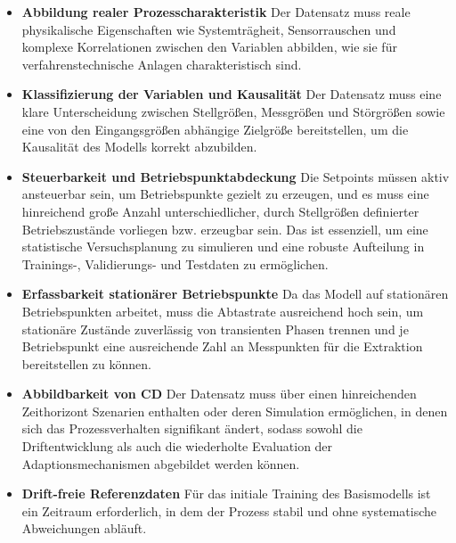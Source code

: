 \begin{itemize}
    \item \textbf{Abbildung realer Prozesscharakteristik} \newline 
    Der Datensatz muss reale physikalische Eigenschaften wie Systemträgheit, Sensorrauschen und komplexe Korrelationen zwischen den Variablen abbilden, wie sie für verfahrenstechnische Anlagen charakteristisch sind.

    \item \textbf{Klassifizierung der Variablen und Kausalität} \newline
    Der Datensatz muss eine klare Unterscheidung zwischen Stellgrößen, Messgrößen und Störgrößen sowie eine von den Eingangsgrößen abhängige Zielgröße bereitstellen, um die Kausalität des Modells korrekt abzubilden.

    \item \textbf{Steuerbarkeit und Betriebspunktabdeckung} \newline
    Die Setpoints müssen aktiv ansteuerbar sein, um Betriebspunkte gezielt zu erzeugen, und es muss eine hinreichend große Anzahl unterschiedlicher, durch Stellgrößen definierter Betriebszustände vorliegen bzw. erzeugbar sein. Das ist essenziell, um eine statistische Versuchsplanung zu simulieren und eine robuste Aufteilung in Trainings-, Validierungs- und Testdaten zu ermöglichen.

    \item \textbf{Erfassbarkeit stationärer Betriebspunkte} \newline 
    Da das Modell auf stationären Betriebspunkten arbeitet, muss die Abtastrate ausreichend hoch sein, um stationäre Zustände zuverlässig von transienten Phasen trennen und je Betriebspunkt eine ausreichende Zahl an Messpunkten für die Extraktion bereitstellen zu können.

    \item \textbf{Abbildbarkeit von \ac{CD}} \newline 
    Der Datensatz muss über einen hinreichenden Zeithorizont Szenarien enthalten oder deren Simulation ermöglichen, in denen sich das Prozessverhalten signifikant ändert, sodass sowohl die Driftentwicklung als auch die wiederholte Evaluation der Adaptionsmechanismen abgebildet werden können.

    \item \textbf{Drift-freie Referenzdaten} \newline 
    Für das initiale Training des Basismodells ist ein Zeitraum erforderlich, in dem der Prozess stabil und ohne systematische Abweichungen abläuft.


\end{itemize}
